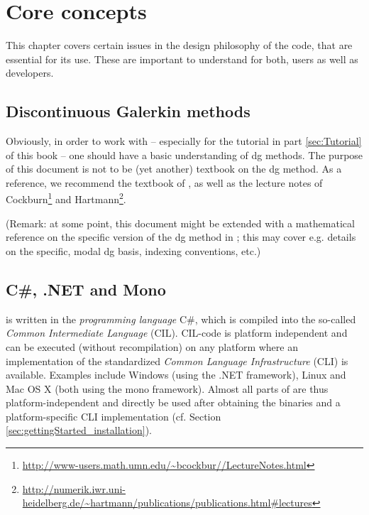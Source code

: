 \documentclass[a4paper,10pt]{report} %
\begin{document}
\chapter{Core concepts}
\label{sec:coreConcepts}

This chapter covers certain issues in the design philosophy of the code, that are essential for its use. 
These are important to understand for both, users as well as developers.

\section{Discontinuous Galerkin methods}
\label{sec:coreConcepts_dgMethods}
Obviously, in order to work with \BoSSS{} -- especially for the tutorial in part \ref{sec:Tutorial}
of this book -- one should have a basic understanding of \ac{dg} methods.
The purpose of this document is not to be (yet another) textbook on the \ac{dg} method.
As a reference, we recommend the textbook of \textcite{DiPietroErn2011},
as well as the lecture notes of Cockburn\footnote{
\url{http://www-users.math.umn.edu/~bcockbur//LectureNotes.html}}
and Hartmann\footnote{
\url{http://numerik.iwr.uni-heidelberg.de/~hartmann/publications/publications.html\#lectures}}.

(Remark: at some point, this document might be extended with a mathematical
reference on the specific version of the \ac{dg} method in \BoSSS; this may cover e.g.
details on the specific, modal \ac{dg} basis, indexing conventions, etc.)


\section{C\#, .NET and Mono}
\label{sec:coreConcepts_CsharpAndDotnet}
\BoSSS{} is written in the \emph{programming language} C\#, which is compiled into the so-called 
\emph{Common Intermediate Language} (CIL). CIL-code is platform independent and can be executed (without recompilation) 
on any platform where an implementation of the standardized \emph{Common Language Infrastructure} (CLI) is available. 
Examples include Windows (using the .NET framework), Linux and Mac OS X (both using the mono framework). 
Almost all parts of \BoSSS{} are thus platform-independent and directly be used after obtaining the \BoSSS{} binaries 
and a platform-specific CLI implementation (cf. Section \ref{sec:gettingStarted_installation}).
\end{document}
